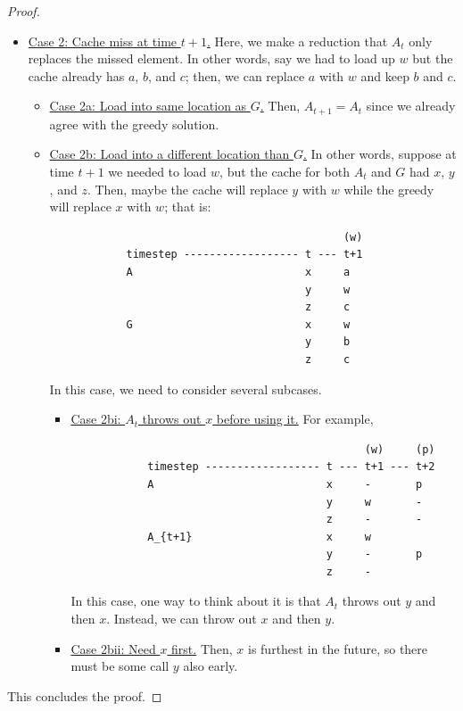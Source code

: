 \documentclass[letterpaper]{article}
\begin{document}
\begin{mdframed}[]
\begin{proof}
\begin{itemize}
            \item \underline{Case 2: Cache miss at time $t + 1$.} Here, we make a reduction that $A_t$ only replaces the missed element. In other words, say we had to load up $w$ but the cache already has $a$, $b$, and $c$; then, we can replace $a$ with $w$ and keep $b$ and $c$. 
            \begin{itemize}
                \item \underline{Case 2a: Load into same location as $G$.} Then, $A_{t + 1} = A_t$ since we already agree with the greedy solution. 
                \item \underline{Case 2b: Load into a different location than $G$.} In other words, suppose at time $t + 1$ we needed to load $w$, but the cache for both $A_t$ and $G$ had $x$, $y$, and $z$. Then, maybe the cache will replace $y$ with $w$ while the greedy will replace $x$ with $w$; that is: 
        \begin{verbatim}
                                              (w)
            timestep ------------------ t --- t+1
            A                           x     a
                                        y     w
                                        z     c
            G                           x     w
                                        y     b
                                        z     c
        \end{verbatim}
                In this case, we need to consider several subcases. 
                \begin{itemize}
                    \item \underline{Case 2bi: $A_t$ throws out $x$ before using it.} For example, 
        \begin{verbatim}
                                              (w)     (p)
            timestep ------------------ t --- t+1 --- t+2
            A                           x     -       p
                                        y     w       -
                                        z     -       -
            A_{t+1}                     x     w
                                        y     -       p
                                        z     -
        \end{verbatim}
                    In this case, one way to think about it is that $A_t$ throws out $y$ and then $x$. Instead, we can throw out $x$ and then $y$. 

                    \item \underline{Case 2bii: Need $x$ first.} Then, $x$ is furthest in the future, so there must be some call $y$ also early.
                \end{itemize}
            \end{itemize}
        \end{itemize}
        This concludes the proof. 
    \end{proof}
\end{mdframed}
\end{document}
